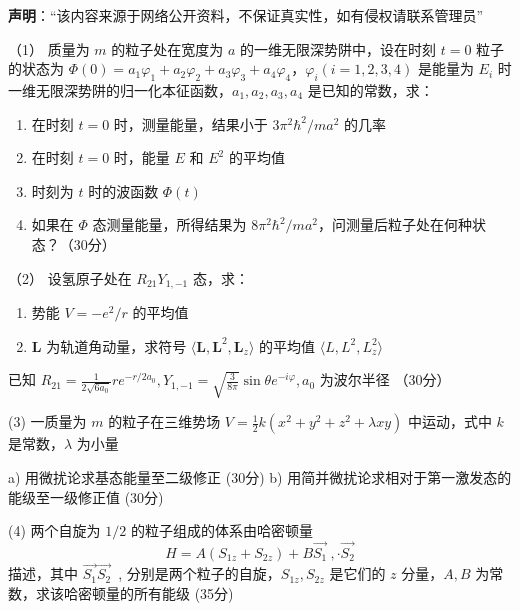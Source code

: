 
\textbf{声明}：“该内容来源于网络公开资料，不保证真实性，如有侵权请联系管理员”


（1） 质量为 $m$ 的粒子处在宽度为 $a$ 的一维无限深势阱中，设在时刻 $t=0$ 粒子的状态为 $\Phi(0) = a_1 \varphi_1 + a_2 \varphi_2 + a_3 \varphi_3 + a_4 \varphi_4$，$\varphi_i (i=1,2,3,4)$ 是能量为 $E_i$ 时一维无限深势阱的归一化本征函数，$a_1, a_2, a_3, a_4$ 是已知的常数，求：

   \begin{enumerate}
      \item 在时刻 $t=0$ 时，测量能量，结果小于 $3 \pi^2 \hbar^2 / ma^2$ 的几率
      \item 在时刻 $t=0$ 时，能量 $E$ 和 $E^2$ 的平均值
      \item 时刻为 $t$ 时的波函数 $\Phi(t)$
      \item 如果在 $\Phi$ 态测量能量，所得结果为 $8 \pi^2 \hbar^2 / ma^2$，问测量后粒子处在何种状态？（30分）
    \end{enumerate}

   （2）  设氢原子处在 $R_{21} Y_{1,-1}$ 态，求：

    \begin{enumerate}
        \item 势能 $V = -e^2 / r$ 的平均值
        \item $\mathbf{L}$ 为轨道角动量，求符号 $\langle \mathbf{L}, \mathbf{L}^2, \mathbf{L}_z \rangle$ 的平均值 $\langle L, L^2, L_z^2 \rangle$
    \end{enumerate}


已知 $R_{21} = \frac{1}{2 \sqrt{6 a_0}} r e^{-r / 2a_0}, Y_{1,-1} = \sqrt{\frac{3}{8 \pi}} \sin \theta e^{-i \varphi}, a_0$ 为波尔半径 （30分）

   (3) 一质量为 $m$ 的粒子在三维势场 $V = \frac{1}{2} k (x^2 + y^2 + z^2 + \lambda xy)$ 中运动，式中 $k$ 是常数，$\lambda$ 为小量

a) 用微扰论求基态能量至二级修正 (30分) 
b) 用简并微扰论求相对于第一激发态的能级至一级修正值 (30分)

(4) 两个自旋为 $1/2$ 的粒子组成的体系由哈密顿量 
$$H = A (S_{1z} + S_{2z}) + B \vec{S_1}~, \cdot \vec{S_2}$$
描述，其中 $\vec{S_1} \vec{S_2}$~, 分别是两个粒子的自旋，$S_{1z}, S_{2z}$ 是它们的 $z$ 分量，$A, B$ 为常数，求该哈密顿量的所有能级  (35分)


